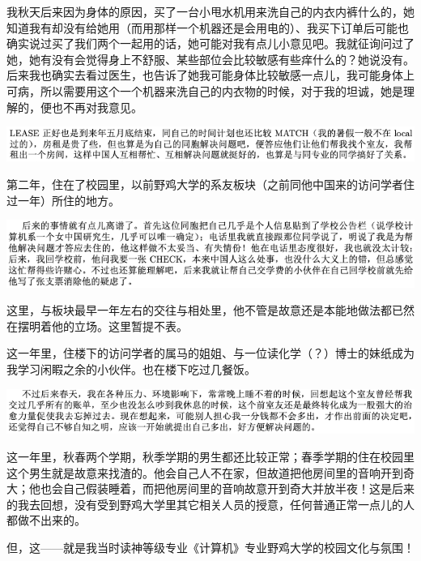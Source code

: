 \documentclass[9pt, b5paper]{article}
\begin{document}
我秋天后来因为身体的原因，买了一台小甩水机用来洗自己的内衣内裤什么的，她知道我有却没有给她用（而用那样一个机器还是会用电的）、我买下订单后可能也确实说过买了我们两个一起用的话，她可能对我有点儿小意见吧。我就征询问过了她，她有没有会觉得身上不舒服、某些部位会比较敏感有些痒什么的？她说没有。后来我也确实去看过医生，也告诉了她我可能身体比较敏感一点儿，我可能身体上可病，所以需要用这个一个机器来洗自己的内衣物的时候，对于我的坦诚，她是理解的，便也不再对我意见。

\begin{center}
\includegraphics[width=.9\linewidth]{./pic/backups_plans_20210429_125611.png}
\end{center}

第二年，住在了校园里，以前野鸡大学的系友板块（之前同他中国来的访问学者住过一年）所住的地方。

\begin{center}
\includegraphics[width=.9\linewidth]{./pic/backups_plans_20210429_133936.png}
\end{center}

这里，与板块最早一年左右的交往与相处里，他不管是故意还是本能地做法都已然在摆明着他的立场。这里暂提不表。

这一年里，住楼下的访问学者的属马的姐姐、与一位读化学（？）博士的妹纸成为我学习闲睱之余的小伙伴。也在楼下吃过几餐饭。

\begin{center}
\includegraphics[width=.9\linewidth]{./pic/backups_plans_20210429_135654.png}
\end{center}

这一年里，秋春两个学期，秋季学期的男生都还比较正常；春季学期的住在校园里这个男生就是故意来找渣的。他会自己人不在家，但故道把他房间里的音响开到奇大；他也会自己假装睡着，而把他房间里的音响故意开到奇大并放半夜！这是后来的我去回想，没有受到野鸡大学里其它相关人员的授意，任何普通正常一点儿的人都做不出来的。

但，这——就是我当时读神等级专业《计算机》专业野鸡大学的校园文化与氛围！
\end{document}
